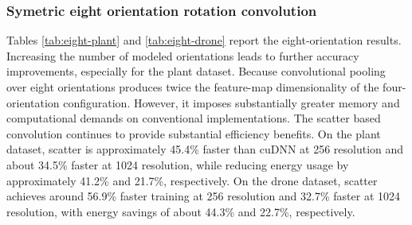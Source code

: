 \subsubsection{Symetric eight orientation rotation convolution}\label{subsubsec:eightOri}
 
Tables \ref{tab:eight-plant} and \ref{tab:eight-drone} report the eight-orientation results. Increasing the number of modeled orientations leads to further accuracy improvements, especially for the plant dataset. Because convolutional pooling over eight orientations produces twice the feature-map dimensionality of the four-orientation configuration. However, it imposes substantially greater memory and computational demands on conventional implementations. The scatter based convolution continues to provide substantial efficiency benefits.
On the plant dataset, scatter is approximately 45.4\% faster than cuDNN at 256 resolution and about 34.5\% faster at 1024 resolution, while reducing energy usage by approximately 41.2\% and 21.7\%, respectively.
On the drone dataset, scatter achieves around 56.9\% faster training at 256 resolution and 32.7\% faster at 1024 resolution, with energy savings of about 44.3\% and 22.7\%, respectively.

